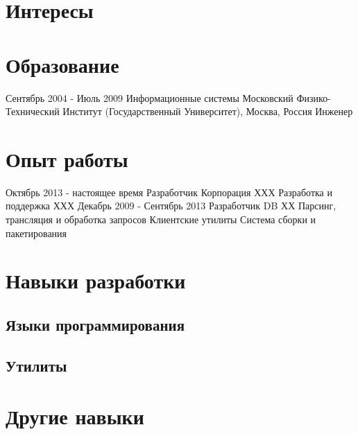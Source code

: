 \documentclass[11pt,a4paper]{moderncv}
\begin{document}
\maketitle

\section{Интересы}
  
\section{Образование}
\cventry
  {Сентябрь 2004 - Июль 2009}
  {Информационные системы}
  {Московский Физико-Технический Институт (Государственный Университет), Москва, Россия}
  {}{}
  {Инженер}

\section{Опыт работы}
\cventry
  {Октябрь 2013 - настоящее время}
  {Разработчик}
  {Корпорация ХХХ}
  {}{}
  {
    Разработка и поддержка ХХХ
  }
\cventry
  {Декабрь 2009 - Сентябрь 2013}
  {Разработчик}
  {DB ХХ}
  {}{}
  {
  	Парсинг, трансляция и обработка запросов\newline{}
    Клиентские утилиты\newline{}
    Система сборки и пакетирования
  }

\section{Навыки разработки}
\subsection{Языки программирования}

\subsection{Утилиты}

\section{Другие навыки}
\end{document}
